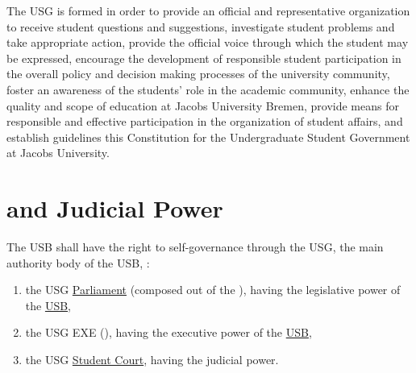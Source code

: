 The \ac{USG}\label{USGdef} is formed in order to provide an official and representative organization to receive student questions and suggestions, investigate student problems and take appropriate action, provide the official voice through which the student  may be expressed, encourage the development of responsible student participation in the overall policy and decision making processes of the university community, foster an awareness of the students' role in the academic community, enhance the quality and scope of education at Jacobs University Bremen, provide means for responsible and effective participation in the organization of student affairs, and establish guidelines  this Constitution for the Undergraduate Student Government at Jacobs University.


\section{ and Judicial Power} 
The \acf{USB}\label{USBdef} shall have the right to self-governance through the \acf{USG}, the main authority body of the USB, :
\begin{enumerate}
    \item the USG \hyperref[USGParliamentDef]{Parliament} \label{USGParliament} (composed out of the ), having the legislative power of the \hyperref[studentbody]{USB},
    \item the USG \acl{EXE} (), having the executive power of the \hyperref[studentbody]{USB},
    \item the USG \hyperref[StudentCourtDef]{Student Court}, having the judicial power.
\end{enumerate}


